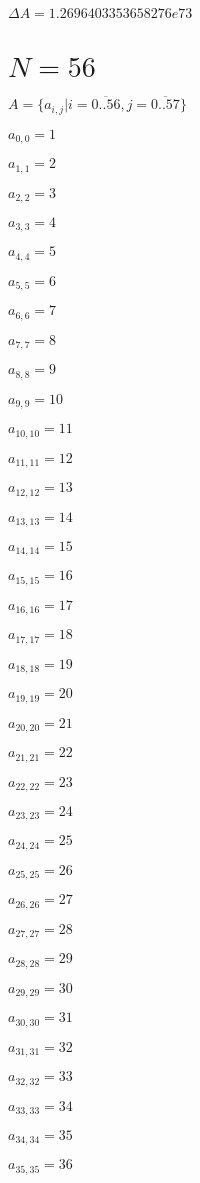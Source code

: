 \documentclass[a4paper,12pt]{article}
\begin{document}
$\Delta A = 1.2696403353658276e73$



\section{ $N = 56$ }
$A = \{ a _{ i, j } | i = \overline { 0..56 }, j = \overline { 0..57 } \}$

$a _{ 0, 0 } = 1$

$a _{ 1, 1 } = 2$

$a _{ 2, 2 } = 3$

$a _{ 3, 3 } = 4$

$a _{ 4, 4 } = 5$

$a _{ 5, 5 } = 6$

$a _{ 6, 6 } = 7$

$a _{ 7, 7 } = 8$

$a _{ 8, 8 } = 9$

$a _{ 9, 9 } = 10$

$a _{ 10, 10 } = 11$

$a _{ 11, 11 } = 12$

$a _{ 12, 12 } = 13$

$a _{ 13, 13 } = 14$

$a _{ 14, 14 } = 15$

$a _{ 15, 15 } = 16$

$a _{ 16, 16 } = 17$

$a _{ 17, 17 } = 18$

$a _{ 18, 18 } = 19$

$a _{ 19, 19 } = 20$

$a _{ 20, 20 } = 21$

$a _{ 21, 21 } = 22$

$a _{ 22, 22 } = 23$

$a _{ 23, 23 } = 24$

$a _{ 24, 24 } = 25$

$a _{ 25, 25 } = 26$

$a _{ 26, 26 } = 27$

$a _{ 27, 27 } = 28$

$a _{ 28, 28 } = 29$

$a _{ 29, 29 } = 30$

$a _{ 30, 30 } = 31$

$a _{ 31, 31 } = 32$

$a _{ 32, 32 } = 33$

$a _{ 33, 33 } = 34$

$a _{ 34, 34 } = 35$

$a _{ 35, 35 } = 36$
\end{document}
